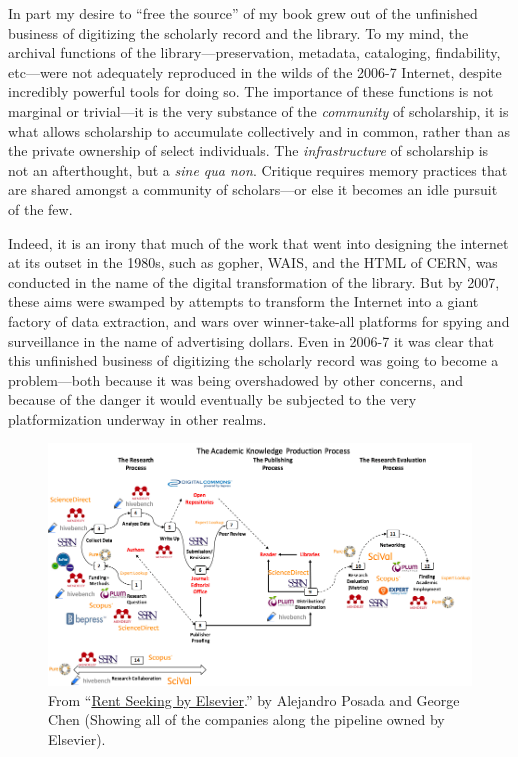 \documentclass[11pt]{article}
\begin{document}
In part my desire to ``free the source'' of my book grew out of the unfinished business of digitizing the scholarly record and the library.  To my mind, the archival functions of the library---preservation, metadata, cataloging, findability, etc---were not adequately reproduced in the wilds of the 2006-7 Internet, despite incredibly powerful tools for doing so. The importance of these functions is not marginal or trivial---it is the very substance of the \emph{community} of scholarship, it is what allows scholarship to accumulate collectively and in common, rather than as the private ownership of select individuals. The \emph{infrastructure} of scholarship is not an afterthought, but a \emph{sine qua non}.  Critique requires memory practices that are shared amongst a community of scholars---or else it becomes an idle pursuit of the few. 

Indeed, it is an irony that much of the work that went into designing the internet at its outset in the 1980s, such as gopher, WAIS, and the HTML of CERN, was conducted in the name of the digital transformation of the library.  But by 2007, these aims were swamped by attempts to transform the Internet into a giant factory of data extraction, and wars over winner-take-all platforms for spying and surveillance in the name of advertising dollars.  Even in 2006-7 it was clear that this unfinished business of digitizing the scholarly record was going to become a problem---both because it was being overshadowed by other concerns, and because of the danger it would eventually be subjected to the very platformization underway in other realms. 

\begin{figure}[htbp]
\centering
\includegraphics[width=.9\linewidth]{./with-companies.png}
\caption{\label{fig:orgac1d8e9}
From ``\href{http://knowledgegap.org/index.php/sub-projects/rent-seeking-and-financialization-of-the-academic-publishing-industry/preliminary-findings/}{Rent Seeking by Elsevier}.'' by Alejandro Posada and George Chen (Showing all of the companies along the pipeline owned by Elsevier).}
\end{figure}
\end{document}
